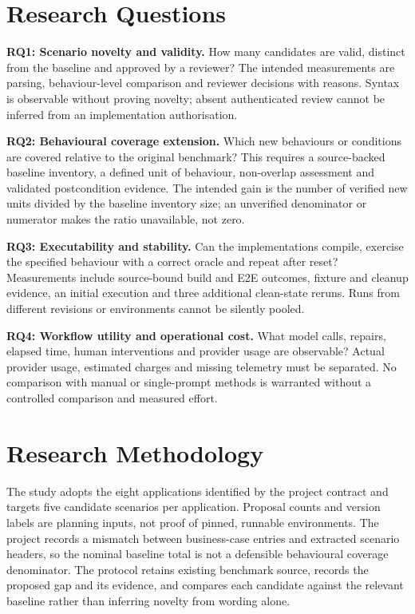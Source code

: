 \documentclass[pdflatex,sn-mathphys-num]{sn-jnl}
\begin{document}
\section{Research Questions}\label{sec:rq}
\textbf{RQ1: Scenario novelty and validity.} How many candidates are valid, distinct from the baseline and approved by a reviewer? The intended measurements are parsing, behaviour-level comparison and reviewer decisions with reasons. Syntax is observable without proving novelty; absent authenticated review cannot be inferred from an implementation authorisation.

\textbf{RQ2: Behavioural coverage extension.} Which new behaviours or conditions are covered relative to the original benchmark? This requires a source-backed baseline inventory, a defined unit of behaviour, non-overlap assessment and validated postcondition evidence. The intended gain is the number of verified new units divided by the baseline inventory size; an unverified denominator or numerator makes the ratio unavailable, not zero.

\textbf{RQ3: Executability and stability.} Can the implementations compile, exercise the specified behaviour with a correct oracle and repeat after reset? Measurements include source-bound build and E2E outcomes, fixture and cleanup evidence, an initial execution and three additional clean-state reruns. Runs from different revisions or environments cannot be silently pooled.

\textbf{RQ4: Workflow utility and operational cost.} What model calls, repairs, elapsed time, human interventions and provider usage are observable? Actual provider usage, estimated charges and missing telemetry must be separated. No comparison with manual or single-prompt methods is warranted without a controlled comparison and measured effort.

\section{Research Methodology}\label{sec:method}
The study adopts the eight applications identified by the project contract and targets five candidate scenarios per application. Proposal counts and version labels are planning inputs, not proof of pinned, runnable environments. The project records a mismatch between business-case entries and extracted scenario headers, so the nominal baseline total is not a defensible behavioural coverage denominator. The protocol retains existing benchmark source, records the proposed gap and its evidence, and compares each candidate against the relevant baseline rather than inferring novelty from wording alone.
\end{document}
